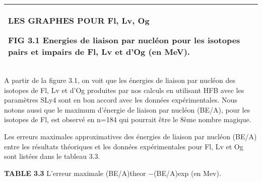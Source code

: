 \begin{flushleft}
\tablefirsthead{}
\tablehead{}
\tabletail{}
\tablelasttail{}
\begin{supertabular}{|m{6.27126in}|}
\hline
{\begin{french}\bfseries  LES GRAPHES POUR  Fl, Lv, Og\end{french}}

{\begin{french} FIG 3.1 Energies de liaison par nucléon pour les isotopes pairs et impairs de Fl, Lv et d’Og (en MeV).\end{french}}\\\hline
\end{supertabular}
\end{flushleft}
 A partir de la figure 3.1, on voit que les énergies de liaison par nucléon des isotopes de Fl, Lv et d’Og produites par nos calculs en utilisant HFB avec les paramètres SLy4 sont en bon accord avec les données expérimentales. Nous notons aussi que le maximum d’énergie de liaison par nucléon (BE/A), pour les isotopes de  Fl, est observé en n=184 qui pourrait être le 8ème nombre magique.

 Les erreurs maximales approximatives des énergies de liaison par nucléon (BE/A) entre les résultats théoriques et les données expérimentales pour Fl, Lv et Og sont listées dans le tableau 3.3.

 \textenglish{\textbf{TABLE 3.3}}\textenglish{ L’erreur maximale (BE/A)theor −(BE/A)exp (en Mev).}

